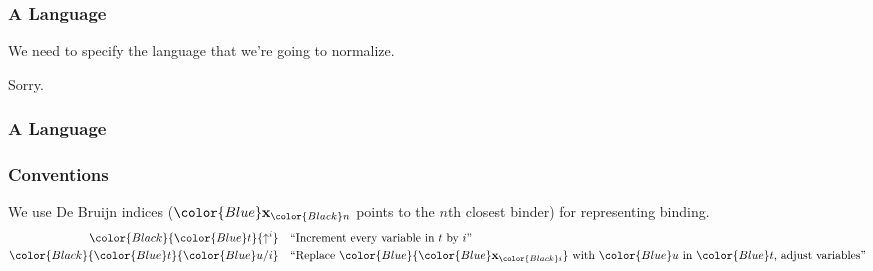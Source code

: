 \documentclass[svgnames]{beamer}
\newcommand\fmttm[1]{{\color{Blue}#1}}
\newcommand{\Uni}{\fmttm{\mathcal{U}}}
\newcommand{\Unit}{\fmttm{\mathsf{Unit}}}
\newcommand{\unit}{\fmttm{\mathsf{tt}}}
\newcommand{\var}[1]{\fmttm{\mathbf{x}_{\color{Black} #1}}}
\newcommand{\emp}{()}
\newcommand{\isctx}[1]{\fmttm{#1}\vdash}
\newcommand{\isterm}[3]{\fmttm{#1}\vdash\fmttm{#2}:\fmttm{#3}}
\newcommand{\istype}[2]{\fmttm{#1}\vdash\fmttm{#2}}
\newcommand{\subst}[3]{{\color{Black} \fmttm{#1}\{\fmttm{#2}/#3\}}}
\newcommand{\weaken}[2]{{\color{Black} \fmttm{#1}\{\uparrow^{#2}\}}}
\newcommand{\app}[2]{{\color{Black} \fmttm{#1}(\fmttm{#2})}}
\begin{document}
\begin{frame}
  \frametitle{A Language}
  \centering
  We need to specify the language that we're going to normalize.

  \pause
  \bigskip

  Sorry.
\end{frame}
\begin{frame}
  \frametitle{A Language}

\end{frame}

\begin{frame}
  \frametitle{Conventions}
  We use De Bruijn indices ($\var{n}$ points to the $n$th closest binder) for representing
  binding.
  \begin{align*}
    \weaken{t}{i} &\quad \text{``Increment every variable in $t$ by $i$''}\\
    \subst{t}{u}{i} &\quad \text{``Replace $\fmttm{\var{i}}$ with $\fmttm{u}$ in $\fmttm{t}$, adjust variables''}
  \end{align*}
\end{frame}
\end{document}
